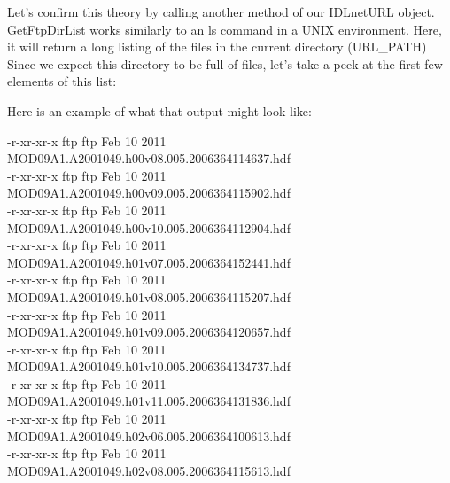 \documentclass{book}
\newcommand{\codefill}{\centering$\longrightarrow$\hfill{\color{gray}\rule[0.1\baselineskip]{0.5\linewidth}{2pt}}\hfill$\longleftarrow$}
\newcounter{highlight}[page]
\newcommand{\tikzhighlightanchor}[1]{\ensuremath{\vcenter{\hbox{\tikz[remember picture, overlay]{\coordinate (#1 highlight \arabic{highlight});}}}}}
\newcommand{\bh}[0]{\stepcounter{highlight}\tikzhighlightanchor{begin}}
\newcommand{\eh}[0]{\tikzhighlightanchor{end}}
\theoremstyle{aside_style}
\begin{document}
Let's confirm this theory by calling another method of our IDLnetURL object.
GetFtpDirList works similarly to an ls command in a UNIX environment. 
Here, it will return a long listing of the files in the current directory (URL\_PATH)
Since we expect this directory to be full of files, let's take a peek at the first few elements of this list:


Here is an example of what that output might look like:

-r-xr-xr-x   \quad ftp   \quad   ftp   Feb 10  2011 MOD09A1.A2001049.h00v08.005.2006364114637.hdf\\
-r-xr-xr-x   \quad ftp   \quad   ftp   Feb 10  2011 MOD09A1.A2001049.h00v09.005.2006364115902.hdf\\
-r-xr-xr-x   \quad ftp   \quad   ftp   Feb 10  2011 MOD09A1.A2001049.h00v10.005.2006364112904.hdf\\
-r-xr-xr-x   \quad ftp   \quad   ftp   Feb 10  2011 MOD09A1.A2001049.h01v07.005.2006364152441.hdf\\
-r-xr-xr-x   \quad ftp   \quad   ftp   Feb 10  2011 MOD09A1.A2001049.h01v08.005.2006364115207.hdf\\
-r-xr-xr-x   \quad ftp   \quad   ftp   Feb 10  2011 MOD09A1.A2001049.h01v09.005.2006364120657.hdf\\
-r-xr-xr-x   \quad ftp   \quad   ftp   Feb 10  2011 MOD09A1.A2001049.h01v10.005.2006364134737.hdf\\
-r-xr-xr-x   \quad ftp   \quad   ftp   Feb 10  2011 MOD09A1.A2001049.h01v11.005.2006364131836.hdf\\
-r-xr-xr-x   \quad ftp   \quad   ftp   Feb 10  2011 MOD09A1.A2001049.h02v06.005.2006364100613.hdf\\
-r-xr-xr-x   \quad ftp   \quad   ftp   Feb 10  2011 MOD09A1.A2001049.h02v08.005.2006364115613.hdf\\
\end{document}
